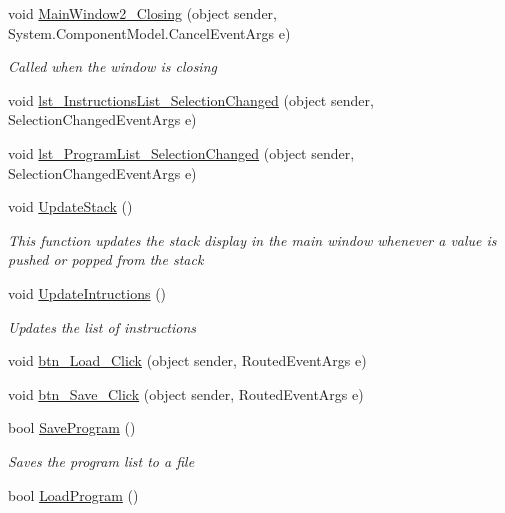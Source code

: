 \begin{DoxyCompactItemize}
void \hyperlink{class_c_p_u___o_s___simulator_1_1_main_window_a23734396aff1eb673bcdc671759c5776}{Main\+Window2\+\_\+\+Closing} (object sender, System.\+Component\+Model.\+Cancel\+Event\+Args e)
\begin{DoxyCompactList}\small\item\em Called when the window is closing \end{DoxyCompactList}\item 
void \hyperlink{class_c_p_u___o_s___simulator_1_1_main_window_a5013d1984fc170246a5dc0d26c6fc493}{lst\+\_\+\+Instructions\+List\+\_\+\+Selection\+Changed} (object sender, Selection\+Changed\+Event\+Args e)
\item 
void \hyperlink{class_c_p_u___o_s___simulator_1_1_main_window_ab563b461cf3d62bd3c88eeb7921bfa75}{lst\+\_\+\+Program\+List\+\_\+\+Selection\+Changed} (object sender, Selection\+Changed\+Event\+Args e)
\item 
void \hyperlink{class_c_p_u___o_s___simulator_1_1_main_window_abd01bb7788b0c104045bcc93cf03c9d6}{Update\+Stack} ()
\begin{DoxyCompactList}\small\item\em This function updates the stack display in the main window whenever a value is pushed or popped from the stack \end{DoxyCompactList}\item 
void \hyperlink{class_c_p_u___o_s___simulator_1_1_main_window_a677bf9ebdb9fe30caa0f52f93e5390c9}{Update\+Intructions} ()
\begin{DoxyCompactList}\small\item\em Updates the list of instructions \end{DoxyCompactList}\item 
void \hyperlink{class_c_p_u___o_s___simulator_1_1_main_window_a13c54c19f906fc84076fe654f82f5398}{btn\+\_\+\+Load\+\_\+\+Click} (object sender, Routed\+Event\+Args e)
\item 
void \hyperlink{class_c_p_u___o_s___simulator_1_1_main_window_a3bbf0774868d6b5da4ff08d70e236fa6}{btn\+\_\+\+Save\+\_\+\+Click} (object sender, Routed\+Event\+Args e)
\item 
bool \hyperlink{class_c_p_u___o_s___simulator_1_1_main_window_a843bbe93c5c2225820d216cc1cb7d4e9}{Save\+Program} ()
\begin{DoxyCompactList}\small\item\em Saves the program list to a file \end{DoxyCompactList}\item 
bool \hyperlink{class_c_p_u___o_s___simulator_1_1_main_window_ad788d74c9d6582f3302912cbbba410b0}{Load\+Program} ()

\end{DoxyCompactItemize}
